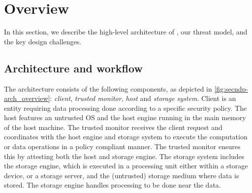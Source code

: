 \section{Overview}
\label{sec:overview}
In this section, we describe the high-level architecture of \project{}, our threat model, and the key design challenges.

\subsection{Architecture and workflow}





The \project{} architecture consists of the following components, as depicted in \autoref{fig:secndp-arch_overview}: \textit{client}, \textit{trusted monitor}, \textit{host} and \textit{storage system}. 
Client is an entity requiring data processing done according to a specific security policy.
The host features an untrusted OS and the host engine running in the main memory of the host machine.
The trusted monitor receives the client request and coordinates with the host engine and storage system to execute the computation or data operations in a policy compliant manner. The trusted monitor ensures this by attesting both the host and storage engine. The storage system includes the storage engine, which is executed in a processing unit either within a storage device, or a storage server, and the (untrusted) storage medium where data is stored. The storage engine handles processing to be done near the data.

